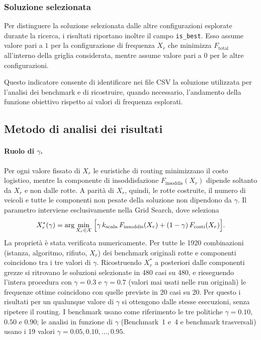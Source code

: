 \subsubsection{Soluzione selezionata}

Per distinguere la soluzione selezionata dalle altre configurazioni esplorate durante la ricerca, i risultati riportano inoltre il campo \texttt{is\_best}. Esso assume valore pari a $1$ per la configurazione di frequenza $X_r$ che minimizza $F_{\mathrm{total}}$ all'interno della griglia considerata, mentre assume valore pari a $0$ per le altre configurazioni.

Questo indicatore consente di identificare nei file CSV la soluzione utilizzata per l'analisi dei benchmark e di ricostruire, quando necessario, l'andamento della funzione obiettivo rispetto ai valori di frequenza esplorati.

\subsection{Metodo di analisi dei risultati}\label{se:metodo-analisi}

\paragraph{Ruolo di $\gamma$.}
Per ogni valore fissato di $X_r$ le euristiche di routing minimizzano il costo logistico, mentre la componente di insoddisfazione $F_{\mathrm{insoddis}}(X_r)$ dipende soltanto da $X_r$ e non dalle rotte. A parità di $X_r$, quindi, le rotte costruite, il numero di veicoli e tutte le componenti non pesate della soluzione non dipendono da $\gamma$. Il parametro interviene esclusivamente nella Grid Search, dove seleziona
\begin{equation}
	X_r^{*}(\gamma)=\arg\min_{X_r\in\mathcal{X}}\;\Bigl[\gamma\,k_{\mathrm{scala}}\,F_{\mathrm{insoddis}}(X_r)+(1-\gamma)\,F_{\mathrm{costi}}(X_r)\Bigr].
\end{equation}
La proprietà è stata verificata numericamente. Per tutte le 1920 combinazioni (istanza, algoritmo, rifiuto, $X_r$) dei benchmark originali rotte e componenti coincidono tra i tre valori di $\gamma$. Ricostruendo $X_r^*$ a posteriori dalle componenti grezze si ritrovano le soluzioni selezionate in 480 casi su 480, e rieseguendo l'intera procedura con $\gamma=0.3$ e $\gamma=0.7$ (valori mai usati nelle run originali) le frequenze ottime coincidono con quelle previste in 20 casi su 20. Per questo i risultati per un qualunque valore di $\gamma$ si ottengono dalle stesse esecuzioni, senza ripetere il routing. I benchmark usano come riferimento le tre politiche $\gamma=0.10$, $0.50$ e $0.90$; le analisi in funzione di $\gamma$ (Benchmark~1 e~4 e benchmark trasversali) usano i 19 valori $\gamma=0.05,0.10,\dots,0.95$.

